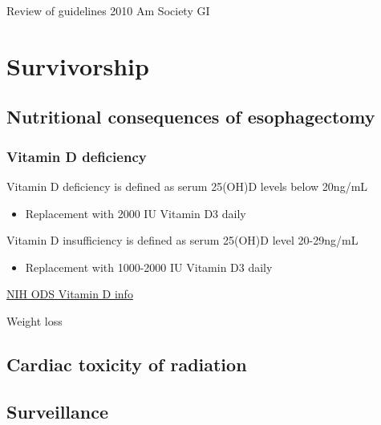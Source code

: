 \documentclass[
]{book}
\providecommand{\tightlist}{%
  \setlength{\itemsep}{0pt}\setlength{\parskip}{0pt}}
\begin{document}
Review of guidelines 2010 Am Society GI \citep{sharma258}

\hypertarget{eso_survivorship}{%
\chapter{Survivorship}\label{eso_survivorship}}

\hypertarget{nutritional-consequences-of-esophagectomy}{%
\section{Nutritional consequences of esophagectomy}\label{nutritional-consequences-of-esophagectomy}}

\hypertarget{vitamin-d-deficiency}{%
\subsection{Vitamin D deficiency}\label{vitamin-d-deficiency}}

Vitamin D deficiency is defined as serum 25(OH)D levels below 20ng/mL

\begin{itemize}
\tightlist
\item
  Replacement with 2000 IU Vitamin D3 daily \citep{khan97}
\end{itemize}

Vitamin D insufficiency is defined as serum 25(OH)D level 20-29ng/mL

\begin{itemize}
\tightlist
\item
  Replacement with 1000-2000 IU Vitamin D3 daily
\end{itemize}

\href{https://ods.od.nih.gov/factsheets/vitamind-healthprofessional/}{NIH ODS Vitamin D info}

\citep{baker987}

Weight loss
\citep{martin1308}
\citep{ouattara1088}

\hypertarget{cardiac-toxicity-of-radiation}{%
\section{Cardiac toxicity of radiation}\label{cardiac-toxicity-of-radiation}}

\citep{beukema85} \citep{frandsen516} \citep{gharzaie0158916}

\hypertarget{eso_surveillance}{%
\section{Surveillance}\label{eso_surveillance}}
\end{document}
